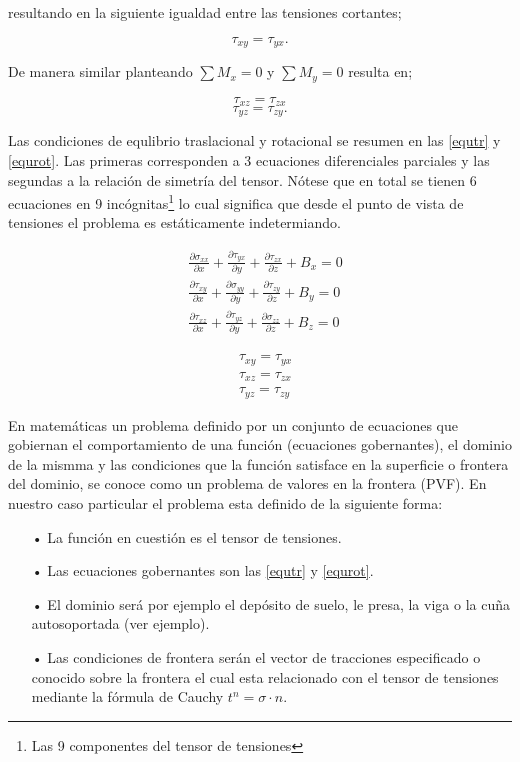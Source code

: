\documentclass[../notas medios.tex]{subfiles}
\begin{document}
resultando en la siguiente igualdad entre las tensiones cortantes;

\[{\tau _{xy}} = {\tau _{yx}}.\]

De manera similar planteando $\sum {{M_x} = 0}$ y $\sum {{M_y} = 0}$ resulta en;

\[{\tau _{xz}} = {\tau _{zx}}\]
\[{\tau _{yz}} = {\tau _{zy}}.\]

Las condiciones de equlibrio traslacional y rotacional se resumen en las \cref{equtr} y \cref{equrot}. Las primeras corresponden a 3 ecuaciones diferenciales parciales y las segundas a la relación de simetría del tensor. Nótese que en total se tienen 6 ecuaciones en 9 incógnitas\footnote{Las 9 componentes del tensor de tensiones} lo cual significa que desde el punto de vista de tensiones el problema es estáticamente indetermiando.

\begin{equation} \label{equtr}
\begin{split}
& \frac{{\partial {\sigma _{xx}}}}{{\partial x}} + \frac{{\partial {\tau _{yx}}}}{{\partial y}} + \frac{{\partial {\tau _{zx}}}}{{\partial z}} + {B_x} = 0 \\
& \frac{{\partial {\tau _{xy}}}}{{\partial x}} + \frac{{\partial {\sigma _{yy}}}}{{\partial y}} + \frac{{\partial {\tau _{zy}}}}{{\partial z}} + {B_y} = 0 \\
& \frac{{\partial {\tau _{xz}}}}{{\partial x}} + \frac{{\partial {\tau _{yz}}}}{{\partial y}} + \frac{{\partial {\sigma _{zz}}}}{{\partial z}} + {B_z} = 0 
\end{split}
\end{equation}

\begin{equation} \label{equrot}
\begin{split}
& \tau _{xy} = {\tau _{yx}} \\
& \tau _{xz} = {\tau _{zx}} \\
& \tau _{yz} = {\tau _{zy}}
\end{split}
\end{equation}

En matemáticas un problema definido por un conjunto de ecuaciones que gobiernan el comportamiento de una función (ecuaciones gobernantes), el dominio de la mismma y las condiciones que la función satisface en la superficie o frontera del dominio, se conoce como un problema de valores en la frontera (PVF). En nuestro caso particular el problema esta definido de la siguiente forma:

\begin{itemize}
\item[•] La función en cuestión es el tensor de tensiones.
\item[•] Las ecuaciones gobernantes son las \cref{equtr} y \cref{equrot}.
\item[•] El dominio será por ejemplo el depósito de suelo, le presa, la viga o la cuña autosoportada (ver ejemplo).
\item[•] Las condiciones de frontera serán el vector de tracciones especificado o conocido sobre la frontera el cual esta relacionado con el tensor de tensiones mediante la fórmula de Cauchy ${t^n} = \sigma  \cdot n$.
\end{itemize}
\end{document}

